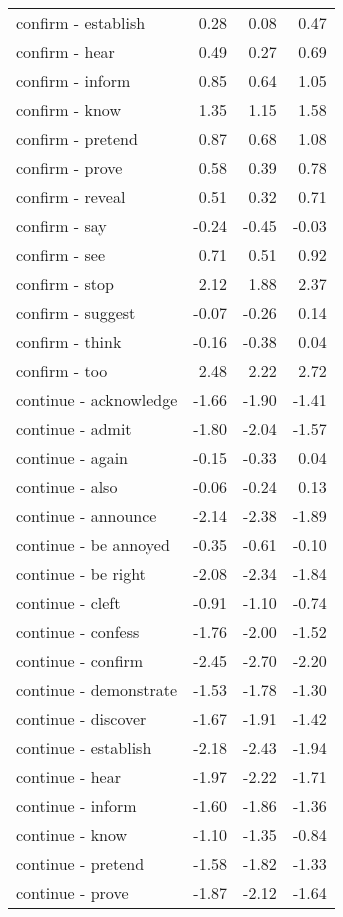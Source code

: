 \begin{longtable}{lrrr}
  confirm - establish & 0.28 & 0.08 & 0.47 \\ 
  confirm - hear & 0.49 & 0.27 & 0.69 \\ 
  confirm - inform & 0.85 & 0.64 & 1.05 \\ 
  confirm - know & 1.35 & 1.15 & 1.58 \\ 
  confirm - pretend & 0.87 & 0.68 & 1.08 \\ 
  confirm - prove & 0.58 & 0.39 & 0.78 \\ 
  confirm - reveal & 0.51 & 0.32 & 0.71 \\ 
  confirm - say & -0.24 & -0.45 & -0.03 \\ 
  confirm - see & 0.71 & 0.51 & 0.92 \\ 
  confirm - stop & 2.12 & 1.88 & 2.37 \\ 
  confirm - suggest & -0.07 & -0.26 & 0.14 \\ 
  confirm - think & -0.16 & -0.38 & 0.04 \\ 
  confirm - too & 2.48 & 2.22 & 2.72 \\ 
  continue - acknowledge & -1.66 & -1.90 & -1.41 \\ 
  continue - admit & -1.80 & -2.04 & -1.57 \\ 
  continue - again & -0.15 & -0.33 & 0.04 \\ 
  continue - also & -0.06 & -0.24 & 0.13 \\ 
  continue - announce & -2.14 & -2.38 & -1.89 \\ 
  continue - be annoyed & -0.35 & -0.61 & -0.10 \\ 
  continue - be right & -2.08 & -2.34 & -1.84 \\ 
  continue - cleft & -0.91 & -1.10 & -0.74 \\ 
  continue - confess & -1.76 & -2.00 & -1.52 \\ 
  continue - confirm & -2.45 & -2.70 & -2.20 \\ 
  continue - demonstrate & -1.53 & -1.78 & -1.30 \\ 
  continue - discover & -1.67 & -1.91 & -1.42 \\ 
  continue - establish & -2.18 & -2.43 & -1.94 \\ 
  continue - hear & -1.97 & -2.22 & -1.71 \\ 
  continue - inform & -1.60 & -1.86 & -1.36 \\ 
  continue - know & -1.10 & -1.35 & -0.84 \\ 
  continue - pretend & -1.58 & -1.82 & -1.33 \\ 
  continue - prove & -1.87 & -2.12 & -1.64 \\ 

\end{longtable}
